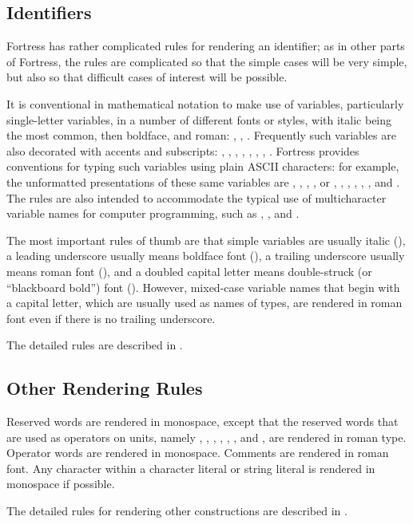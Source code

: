 \subsection{Identifiers}

Fortress has rather complicated rules for rendering an identifier;
as in other parts of Fortress, the rules are complicated so that
the simple cases will be very simple, but also so that difficult
cases of interest will be possible.

It is conventional in mathematical notation to make use of variables,
particularly single-letter variables, in a number of different fonts or styles,
with italic being the most common, then boldface, and roman:
, , .  Frequently such variables
are also decorated with accents and subscripts:
, , , , ,
, , .
Fortress provides conventions for typing such variables using
plain ASCII characters: for example, the unformatted presentations of these same
variables are , , ,
,  or , ,
, ,
, ,
and .  The rules are also intended to accommodate
the typical use of multicharacter variable names for computer programming,
such as , , and .

The most important rules of thumb are that simple variables are usually italic  (),
a leading underscore usually means boldface font  (),
a trailing underscore usually means roman font  (),
and a doubled capital letter means double-struck (or ``blackboard bold'') font  ().
However, mixed-case variable names that begin with a capital letter,
which are usually used as names of types, are rendered in roman font
even if there is no trailing underscore.

The detailed rules are described in .


\subsection{Other Rendering Rules}

\label{otherRendering}
Reserved words are rendered in monospace, except that the reserved words
that are used as operators on units, namely
,
,
,
,
,
, and
, are rendered in roman type.
Operator words are rendered in monospace.
Comments are rendered in roman font.
Any character within a character literal or string literal is
rendered in monospace if possible.

The detailed rules for rendering other constructions
are described in .
